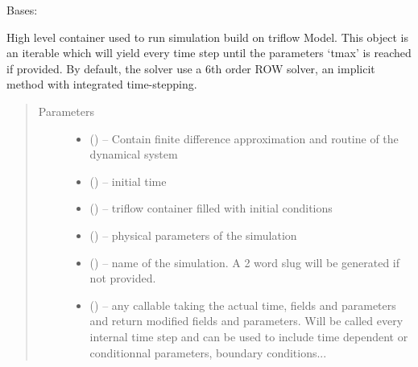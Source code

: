 \documentclass[letterpaper,10pt,english]{sphinxmanual}
\begin{document}
\begin{fulllineitems}
\label{\detokenize{triflow.core:triflow.core.simulation.Simulation}}
Bases: 

High level container used to run simulation build on triflow Model.
This object is an iterable which will yield every time step until the parameters `tmax' is reached if provided.
By default, the solver use a 6th order ROW solver, an implicit method with integrated time-stepping.
\begin{quote}\begin{description}
\item[{Parameters}] \leavevmode\begin{itemize}
\item {} 
 () -- Contain finite difference approximation and routine of the dynamical system

\item {} 
 () -- initial time

\item {} 
 () -- triflow container filled with initial conditions

\item {} 
 () -- physical parameters of the simulation

\item {} 
 (\sphinxstyleliteralemphasis{, }) -- name of the simulation. A 2 word slug will be generated if not provided.

\item {} 
 (\sphinxstyleliteralemphasis{, }) -- any callable taking the actual time, fields and parameters and return modified fields and parameters. Will be called every internal time step and can be used to include time dependent or conditionnal parameters, boundary conditions...


\end{itemize}
\end{description}
\end{quote}
\end{fulllineitems}
\end{document}
